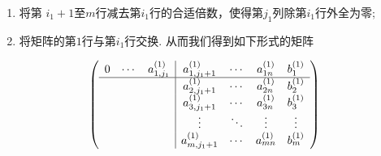 \begin{frame}
\begin{enumerate}
\item 将第 $i_1+1$至$m$行减去第$i_1$行的合适倍数，使得第$j_1$列除第$i_1$行外全为零;
\pp
\bigskip
\item 将矩阵的第$1$行与第$i_1$行交换. \pp 从而我们得到如下形式的矩阵
\end{enumerate}

\bigskip

\begin{equation*}
\left(\begin{array}{ccc|cccc}
0 & \cdots & a_{1,j_1}^{(1)} & a_{1,j_1+1}^{(1)} & \cdots & a_{1n}^{(1)} & b_{1}^{(1)} \\ \hline
&  &   & a_{2,j_1+1}^{(1)} & \cdots & a_{2n}^{(1)} & b_{2}^{(1)} \\
& &   & a_{3,j_1+1}^{(1)} & \cdots & a_{3n}^{(1)} & b_{3}^{(1)} \\
& &  &\vdots &\ddots &\vdots &\vdots \\
&   &  & a_{m,j_1+1}^{(1)} & \cdots & a_{mn}^{(1)} & b_{m}^{(1)} \\
\end{array}\right)
\end{equation*}
\end{frame}





